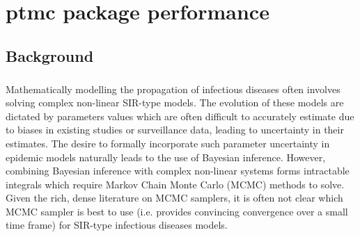 \documentclass[10pt,twoside]{report} %
\begin{document}




\setcounter{secnumdepth}{2}

\setcounter{tocdepth}{2}

\newpage %










\chapter{ptmc package performance}

\section{Background}
\paragraph{}Mathematically modelling the propagation of infectious diseases often involves solving complex non-linear SIR-type models. The evolution of these models are dictated by parameters values which are often difficult to accurately estimate due to biases in existing studies or surveillance data, leading to uncertainty in their estimates. The desire to formally incorporate such parameter uncertainty in epidemic models naturally leads to the use of Bayesian inference. However, combining Bayesian inference with complex non-linear systems forms intractable integrals which require Markov Chain Monte Carlo (MCMC) methods to solve. Given the rich, dense literature on MCMC samplers, it is often not clear which MCMC sampler is best to use (i.e. provides convincing convergence over a small time frame) for SIR-type infectious diseases models. 
\end{document}
